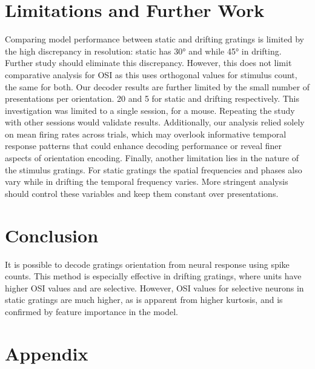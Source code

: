 \documentclass[10pt,twocolumn]{article}
\begin{document}
\section{Limitations and Further Work}

Comparing model performance between static and drifting gratings is limited by the high discrepancy in resolution: static has 30° and while 45° in drifting. Further study should eliminate this discrepancy. However, this does not limit comparative analysis for OSI as this uses orthogonal values for stimulus count, the same for both. Our decoder results are further limited by the small number of presentations per orientation. 20 and 5 for static and drifting respectively. This investigation was limited to a single session, for a mouse. Repeating the study with other sessions would validate results. Additionally, our analysis relied solely on mean firing rates across trials, which may overlook informative temporal response patterns that could enhance decoding performance or reveal finer aspects of orientation encoding. Finally, another limitation lies in the nature of the stimulus gratings. For static gratings the spatial frequencies and phases also vary while in drifting the temporal frequency varies. More stringent analysis should control these variables and keep them constant over presentations.

\section{Conclusion}

It is possible to decode gratings orientation from neural response using spike counts. This method is especially effective in drifting gratings, where units have higher OSI values and are selective. However, OSI values for selective neurons in static gratings are much higher, as is apparent from higher kurtosis, and is confirmed by feature importance in the model.

\newpage

\appendix

\section{Appendix}
\end{document}
